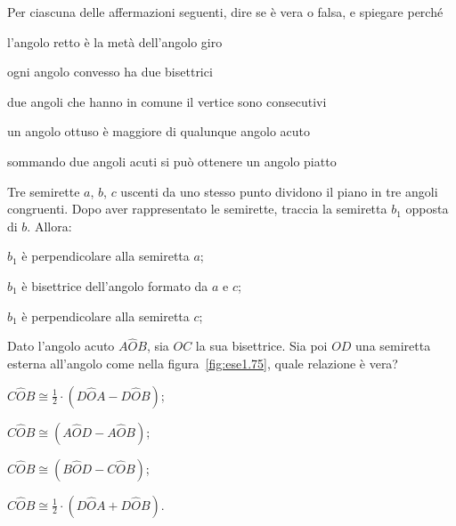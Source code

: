 \begin{esercizio}
\label{ese:1.73}
Per ciascuna delle affermazioni seguenti, dire se è vera o falsa, e spiegare perché
\begin{enumeratea}
\item l'angolo retto è la metà dell'angolo giro	\tab\tab\tab\qquad\boxV\quad\boxF
\item ogni angolo convesso ha due bisettrici		\tab\tab\tab\qquad\boxV\quad\boxF
\item due angoli che hanno in comune il vertice sono consecutivi	\tab\qquad\boxV\quad\boxF
\item un angolo ottuso è maggiore di qualunque angolo acuto		\tab\qquad\boxV\quad\boxF
\item sommando due angoli acuti si può ottenere un angolo piatto	\tab\qquad\boxV\quad\boxF
\end{enumeratea}
\end{esercizio}

\begin{esercizio}
\label{ese:1.74}
Tre semirette $a$, $b$, $c$ uscenti da uno stesso punto dividono il piano in tre angoli congruenti. Dopo aver rappresentato le semirette, traccia la semiretta $b_1$ opposta di $b$. Allora:
\begin{enumeratea}
\item $b_1$ è perpendicolare alla semiretta $a$;
\item $b_1$ è bisettrice dell'angolo formato da $a$ e $c$;
\item $b_1$ è perpendicolare alla semiretta $c$;
\end{enumeratea}
\end{esercizio}

\begin{esercizio}
\label{ese:1.75}
Dato l'angolo acuto $A\widehat{O}B$, sia $OC$ la sua bisettrice. Sia poi $OD$ una semiretta esterna all'angolo come nella figura~\ref{fig:ese1.75}, quale relazione è vera?
\begin{multicols}{2}
\begin{enumeratea}
\item $C\widehat{O}B\cong \frac{1}{2}\cdot(D\widehat{O}A-D\widehat{O}B)$;
\item $C\widehat{O}B\cong (A\widehat{O}D-A\widehat{O}B)$;
\item $C\widehat{O}B\cong (B\widehat{O}D-C\widehat{O}B)$;
\item $C\widehat{O}B\cong \frac{1}{2}\cdot(D\widehat{O}A+D\widehat{O}B)$.
\end{enumeratea}
\end{multicols}
\end{esercizio}

